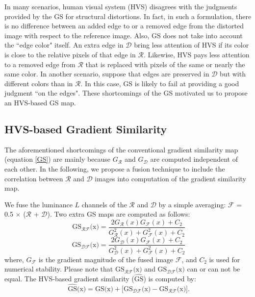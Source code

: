 In many scenarios, human visual system (HVS) disagrees with the judgments provided by the GS for structural distortions. In fact, in such a formulation, there is no difference between an added edge to or a removed edge from the distorted image with respect to the reference image. Also, GS does not take into account the ``edge color" itself. An extra edge in $\mathcal{D}$ bring less attention of HVS if its color is close to the relative pixels of that edge in $\mathcal{R}$. Likewise, HVS pays less attention to a removed edge from $\mathcal{R}$ that is replaced with pixels of the same or nearly the same color. In another scenario, suppose that edges are preserved in $\mathcal{D}$ but with different colors than in $\mathcal{R}$. In this case, GS is likely to fail at providing a good judgment ``on the edges". These shortcomings of the GS motivated us to propose an HVS-based GS map. 



\subsection{HVS-based Gradient Similarity} 

The aforementioned shortcomings of the conventional gradient similarity map (equation \ref{GS}) are mainly because $G_\mathcal{R}$ and $G_\mathcal{D}$ are computed independent of each other. In the following, we propose a fusion technique to include the correlation between $\mathcal{R}$ and $\mathcal{D}$ images into computation of the gradient similarity map.   

We fuse the luminance $L$ channels of the $\mathcal{R}$ and $\mathcal{D}$ by a simple averaging: $\mathcal{F}$ = 0.5 $\times$ ($\mathcal{R}$ + $\mathcal{D}$). Two extra GS maps are computed as follows: 
\begin{equation}
  \ \text{GS}_{\mathcal{RF}}\text{(x)}=\frac{2 G_\mathcal{R}(x) G_\mathcal{F}(x) + C_2} {G_\mathcal{R}^2(x) + G_\mathcal{F}^2(x) + C_2}
  \label{GS}
\end{equation}                    
\begin{equation}
  \ \text{GS}_{\mathcal{DF}}\text{(x)}=\frac{2 G_\mathcal{D}(x) G_\mathcal{F}(x) + C_2} {G_\mathcal{D}^2(x) + G_\mathcal{F}^2(x) + C_2}
  \label{GS}
\end{equation}                    
where, $G_\mathcal{F}$ is the gradient magnitude of the fused image $\mathcal{F}$, and $C_2$ is used for numerical stability. Please note that $\text{GS}_{\mathcal{RF}}\text{(x)}$ and $\text{GS}_{\mathcal{DF}}\text{(x)}$ can or can not be equal. The HVS-based gradient similarity ($\widehat{\text{GS}}$) is computed by:
\begin{equation}
  \ \widehat{\text{GS}} \text{(x)} = \text{GS(x)} + \big[ \text{GS}_{\mathcal{DF}}\text{(x)} - \text{GS}_{\mathcal{RF}}\text{(x)} \big].
  \label{GS}
\end{equation}     

